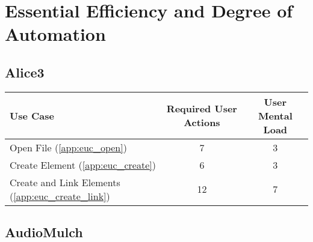 \section{Essential Efficiency and Degree of Automation}

\subsection*{Alice3}




\begin{tabularx}{\textwidth}{Xcc}
\textbf{Use Case} & \textbf{Required User Actions} & \textbf{User Mental Load}\\
\hline
Open File (\ref{app:euc_open})                       & 7  & 3 \\
Create Element (\ref{app:euc_create})                & 6  & 3 \\
Create and Link Elements (\ref{app:euc_create_link}) & 12 & 7
\end{tabularx}

\subsection*{AudioMulch}


